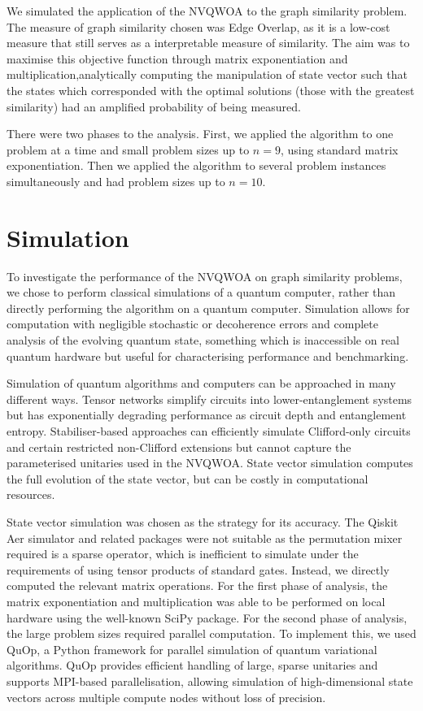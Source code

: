 We simulated the application of the NVQWOA to the graph similarity problem. The measure of graph similarity chosen was Edge Overlap, as it is a low-cost measure that still serves as a interpretable measure of similarity. The aim was to maximise this objective function through matrix exponentiation and multiplication,analytically computing the manipulation of state vector such that the states which corresponded with the optimal solutions (those with the greatest similarity) had an amplified probability of being measured.

There were two phases to the analysis. First, we applied the algorithm to one problem at a time and small problem sizes up to $n=9$, using standard matrix exponentiation. Then we applied the algorithm to several problem instances simultaneously and had problem sizes up to $n=10$.

\section{Simulation}

To investigate the performance of the NVQWOA on graph similarity problems, we chose to perform classical simulations of a quantum computer, rather than directly performing the algorithm on a quantum computer. Simulation allows for computation with negligible stochastic or decoherence errors and complete analysis of the evolving quantum state, something which is inaccessible on real quantum hardware but useful for characterising performance and benchmarking.

Simulation of quantum algorithms and computers can be approached in many different ways. Tensor networks simplify circuits into lower-entanglement systems but has exponentially degrading performance as circuit depth and entanglement entropy. Stabiliser-based approaches can efficiently simulate Clifford-only circuits and certain restricted non-Clifford extensions but cannot capture the parameterised unitaries used in the NVQWOA. State vector simulation computes the full evolution of the state vector, but can be costly in computational resources.

State vector simulation was chosen as the strategy for its accuracy. The Qiskit Aer simulator and related packages were not suitable as the permutation mixer required is a sparse operator, which is inefficient to simulate under the requirements of using tensor products of standard gates. Instead, we directly computed the relevant matrix operations. For the first phase of analysis, the matrix exponentiation and multiplication was able to be performed on local hardware using the well-known SciPy package. For the second phase of analysis, the large problem sizes required parallel computation. To implement this, we used QuOp, a Python framework for parallel simulation of quantum variational algorithms\cite{QuOp_MPI_paper_variational,QuOp_MPI}. QuOp provides efficient handling of large, sparse unitaries and supports MPI-based parallelisation, allowing simulation of high-dimensional state vectors across multiple compute nodes without loss of precision.

